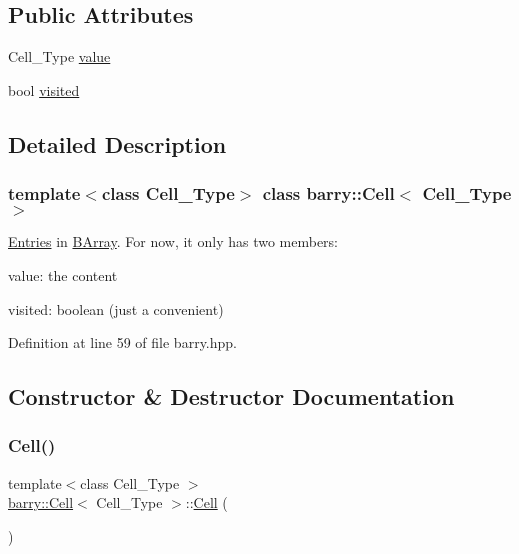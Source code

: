 \subsection*{Public Attributes}
\begin{DoxyCompactItemize}
\item 
Cell\+\_\+\+Type \hyperlink{classbarry_1_1_cell_a52918ded332c6a12109b5962d6bf3ae9}{value}
\item 
bool \hyperlink{classbarry_1_1_cell_ad7800879e5079e6b5a3982827adc38c1}{visited}
\end{DoxyCompactItemize}


\subsection{Detailed Description}
\subsubsection*{template$<$class Cell\+\_\+\+Type$>$\newline
class barry\+::\+Cell$<$ Cell\+\_\+\+Type $>$}

\hyperlink{classbarry_1_1_entries}{Entries} in \hyperlink{classbarry_1_1_b_array}{B\+Array}. For now, it only has two members\+: 


\begin{DoxyItemize}
\item value\+: the content
\item visited\+: boolean (just a convenient) 
\end{DoxyItemize}

Definition at line 59 of file barry.\+hpp.



\subsection{Constructor \& Destructor Documentation}
\mbox{\label{classbarry_1_1_cell_aa7beee933fc291cbc4ac84ec3ab63352}} 
\subsubsection{\texorpdfstring{Cell()}{Cell()}\hspace{0.1cm}{\footnotesize\ttfamily [1/5]}}
{\footnotesize\ttfamily template$<$class Cell\+\_\+\+Type $>$ \\
\hyperlink{classbarry_1_1_cell}{barry\+::\+Cell}$<$ Cell\+\_\+\+Type $>$\+::\hyperlink{classbarry_1_1_cell}{Cell} (\begin{DoxyParamCaption}{ }\end{DoxyParamCaption})}


